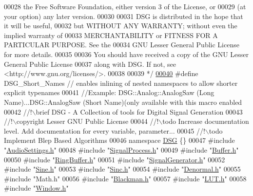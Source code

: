 \begin{DoxyCode}
00028 \textcolor{comment}{ the Free Software Foundation, either version 3 of the License, or}
00029 \textcolor{comment}{ (at your option) any later version.}
00030 \textcolor{comment}{}
00031 \textcolor{comment}{ DSG is distributed in the hope that it will be useful,}
00032 \textcolor{comment}{ but WITHOUT ANY WARRANTY; without even the implied warranty of}
00033 \textcolor{comment}{ MERCHANTABILITY or FITNESS FOR A PARTICULAR PURPOSE.  See the}
00034 \textcolor{comment}{ GNU Lesser General Public License for more details.}
00035 \textcolor{comment}{}
00036 \textcolor{comment}{ You should have received a copy of the GNU Lesser General Public License}
00037 \textcolor{comment}{ along with DSG.  If not, see <http://www.gnu.org/licenses/>.}
00038 \textcolor{comment}{}
00039 \textcolor{comment}{ */}
\hypertarget{_d_s_g_8h_source_l00040}{}\hyperlink{_d_s_g_8h_a83f0da18914977ca7a09b93cb1f57a05}{00040} \textcolor{preprocessor}{#define DSG\_Short\_Names // enables inlining of nested namespaces to allow shorter explicit typenames}
00041 \textcolor{comment}{//Example: DSG::Analog::AnalogSaw (Long Name)...DSG::AnalogSaw (Short Name)(only available with this macro
       enabled}\textcolor{comment}{}
00042 \textcolor{comment}{//!\(\backslash\)brief DSG - A Collection of tools for Digital Signal Generation}
00043 \textcolor{comment}{//!\(\backslash\)copyright Lesser GNU Public License}
00044 \textcolor{comment}{//!\(\backslash\)todo Increase documentation level. Add documentation for every variable, parameter...}
00045 \textcolor{comment}{//!\(\backslash\)todo Implement Blep Based Algorithms}
00046 \textcolor{comment}{}\textcolor{keyword}{namespace }\hyperlink{namespace_d_s_g}{DSG} \{\}
00047 \textcolor{preprocessor}{#include "\hyperlink{_audio_settings_8h}{AudioSettings.h}"}
00048 \textcolor{preprocessor}{#include "\hyperlink{_signal_process_8h}{SignalProcess.h}"}
00049 \textcolor{preprocessor}{#include "\hyperlink{_buffer_8h}{Buffer.h}"}
00050 \textcolor{preprocessor}{#include "\hyperlink{_ring_buffer_8h}{RingBuffer.h}"}
00051 \textcolor{preprocessor}{#include "\hyperlink{_signal_generator_8h}{SignalGenerator.h}"}
00052 \textcolor{preprocessor}{#include "\hyperlink{_sine_8h}{Sine.h}"}
00053 \textcolor{preprocessor}{#include "\hyperlink{_sinc_8h}{Sinc.h}"}
00054 \textcolor{preprocessor}{#include "\hyperlink{_denormal_8h}{Denormal.h}"}
00055 \textcolor{preprocessor}{#include "Math.h"}
00056 \textcolor{preprocessor}{#include "\hyperlink{_blackman_8h}{Blackman.h}"}
00057 \textcolor{preprocessor}{#include "\hyperlink{_l_u_t_8h}{LUT.h}"}
00058 \textcolor{preprocessor}{#include "\hyperlink{_window_8h}{Window.h}"}

\end{DoxyCode}

